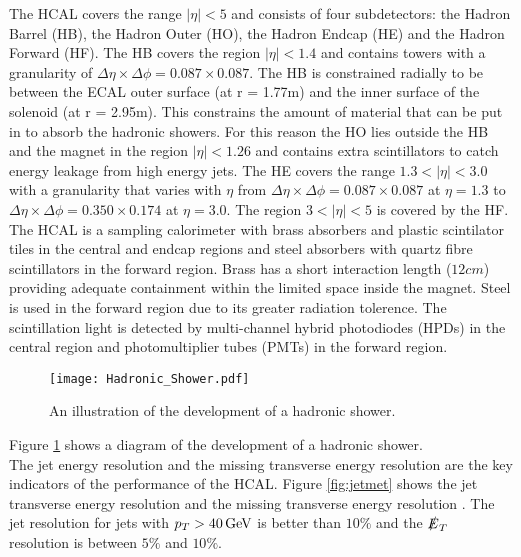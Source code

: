 The HCAL covers the range $|\eta| < 5$ and consists of four subdetectors: the
Hadron Barrel (HB), the Hadron Outer (HO), the Hadron Endcap (HE) and the Hadron
Forward (HF). The HB covers the region $|\eta| < 1.4$ and contains towers with a 
granularity of $\Delta\eta\times\Delta\phi = 0.087\times0.087$. The HB is 
constrained radially to be between the ECAL outer surface (at r = 1.77m) and the
inner surface of the solenoid (at r = 2.95m). This constrains the amount of 
material that can be put in to absorb the hadronic showers. For this reason the 
HO lies outside the HB and the magnet in the region $|\eta| < 1.26$ and contains
extra scintillators to catch energy leakage from high energy jets. The HE covers
the range $1.3 < |\eta| < 3.0$ with a granularity that varies with $\eta$ from 
$\Delta\eta\times\Delta\phi = 0.087\times0.087$ at $\eta = 1.3$ to 
$\Delta\eta\times\Delta\phi = 0.350\times0.174$ at $\eta = 3.0$. The region $3 <
 |\eta| < 5$ is covered by the HF. \\

The HCAL is a sampling calorimeter with brass absorbers and plastic scintilator
tiles in the central and endcap regions and steel absorbers with quartz fibre 
scintillators in the forward region. Brass has a short interaction length
($12\unit{cm}$) providing adequate containment within the limited space inside 
the magnet. Steel is used in the forward region due to its greater radiation 
tolerence. The scintillation light is detected by multi-channel hybrid 
photodiodes (HPDs) in the central region and photomultiplier tubes (PMTs) in the 
forward region. \\

\begin{figure}
\begin{center}
\texttt{[image: Hadronic\_Shower.pdf]}
\end{center}
\caption{An illustration of the development of a hadronic shower.}
\label{fig:hadronic_shower}
\end{figure}

Figure \ref{fig:hadronic_shower} shows a diagram of the development of a
hadronic shower. \\

The jet energy resolution and the missing transverse energy resolution are the 
key indicators of the performance of the HCAL. Figure \ref{fig:jetmet} shows the
jet transverse energy resolution and the missing transverse energy resolution
\cite{jet_resolution, met_resolution}. The jet resolution for jets with $p_{T} >
40\, \mathrm{GeV}$ is better than $10\unit{\%}$ and the $\slashed{E}_{T}$ resolution is between
$5\unit{\%}$ and $10\unit{\%}$.

